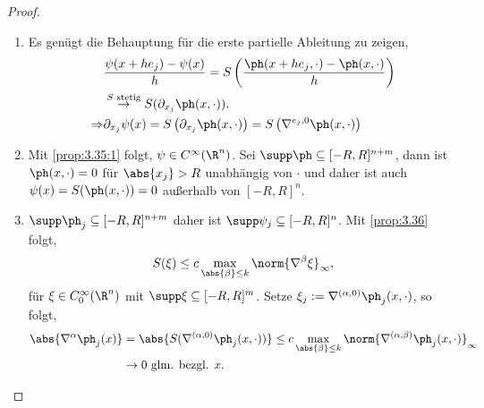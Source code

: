 \begin{proof}
\begin{enumerate}[label=(\roman{*})]
  \item Es genügt die Behauptung für die erste partielle Ableitung zu zeigen,
\begin{align*}
&\frac{\psi(x+he_j)-\psi(x)}{h} =
S\left(\frac{\ph(x+he_j,\cdot)-\ph(x,\cdot)}{h} \right)\\ & \overset{S\text{
stetig}}{\to} S(\partial_{x_j}\ph(x,\cdot) ).\\ \Rightarrow &
\partial_{x_j}\psi(x) = S\left(\partial_{x_j} \ph(x,\cdot) \right)
= S\left(\nabla^{e_j,0} \ph(x,\cdot) \right)
\end{align*}
\item Mit \ref{prop:3.35:1} folgt, $\psi\in C^\infty(\R^n)$.  Sei
$\supp\ph\subseteq [-R,R]^{n+m}$, dann ist $\ph(x,\cdot) =0$ für $\abs{x_j}>R$
unabhängig von $\cdot$ und daher ist auch $\psi(x) = S(\ph(x,\cdot)) = 0$ außerhalb von
$[-R,R]^n$.
\item $\supp\ph_j \subseteq [-R,R]^{n+m}$ daher ist $\supp\psi_j\subseteq
[-R,R]^n$. Mit \ref{prop:3.36} folgt,
\begin{align*}
S(\xi) \le c\max\limits_{\abs{\beta}\le k}\norm{\nabla^\beta \xi}_\infty,
\end{align*}
für $\xi\in C_0^\infty(\R^n)$ mit $\supp\xi\subseteq [-R,R]^m$. Setze $\xi_j :=
\nabla^{(\alpha,0)}\ph_j(x,\cdot)$, so folgt,
\begin{align*}
\abs{\nabla^\alpha \ph_j(x)} &= \abs{S(\nabla^{(\alpha,0)} \ph_j(x,\cdot))} \le
c \max\limits_{\abs{\beta}\le k}\norm{\nabla^{(\alpha,\beta)}
\ph_j(x,\cdot)}_\infty\\
&\to 0\text{ glm. bezgl. } x.\qedhere
\end{align*}
\end{enumerate}
\end{proof}


